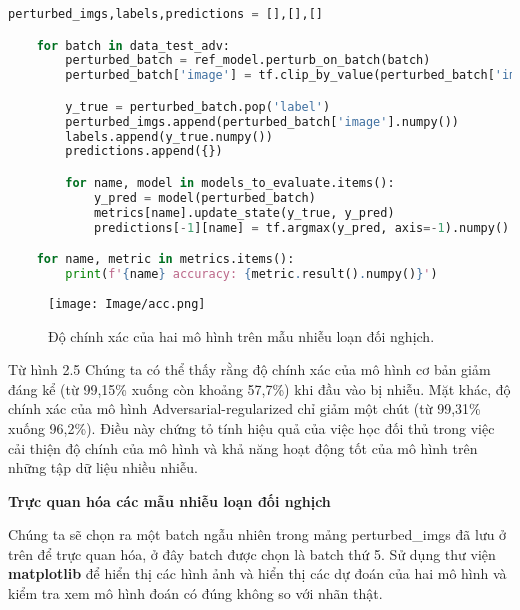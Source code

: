 \begin{lstlisting}[language = Python]
    perturbed_imgs,labels,predictions = [],[],[]

    for batch in data_test_adv:
        perturbed_batch = ref_model.perturb_on_batch(batch)
        perturbed_batch['image'] = tf.clip_by_value(perturbed_batch['image'], 0, 1)

        y_true = perturbed_batch.pop('label')
        perturbed_imgs.append(perturbed_batch['image'].numpy())
        labels.append(y_true.numpy())
        predictions.append({})

        for name, model in models_to_evaluate.items():
            y_pred = model(perturbed_batch)
            metrics[name].update_state(y_true, y_pred)
            predictions[-1][name] = tf.argmax(y_pred, axis=-1).numpy()

    for name, metric in metrics.items():
        print(f'{name} accuracy: {metric.result().numpy()}')

\end{lstlisting}

\begin{figure}[h!]
    \centering
    \texttt{[image: Image/acc.png]}
    \caption{Độ chính xác của hai mô hình trên mẫu nhiễu loạn đối nghịch.}
    \label{fig 2.5:Độ chính xác của hai mô hình trên mẫu nhiễu loạn đối nghịch.}
    
\end{figure}

Từ hình 2.5 Chúng ta có thể thấy rằng độ chính xác của mô hình cơ bản giảm đáng kể (từ 99,15\% xuống còn khoảng 57,7\%) khi đầu vào bị nhiễu. Mặt khác, 
độ chính xác của mô hình Adversarial-regularized chỉ giảm một chút (từ 99,31\% xuống 96,2\%). Điều này chứng tỏ tính hiệu quả của việc học đối thủ trong 
việc cải thiện độ chính của mô hình và khả năng hoạt động tốt của mô hình trên những tập dữ liệu nhiều nhiễu.

\textbf{Trực quan hóa các mẫu nhiễu loạn đối nghịch}

Chúng ta sẽ chọn ra một batch ngẫu nhiên trong mảng perturbed\_imgs đã lưu ở trên để trực quan hóa, ở đây batch được chọn là batch thứ 5.
Sử dụng thư viện \textbf{matplotlib} để hiển thị các hình ảnh và hiển thị các dự đoán của hai mô hình và kiểm tra xem mô hình đoán có đúng không so với
nhãn thật.


